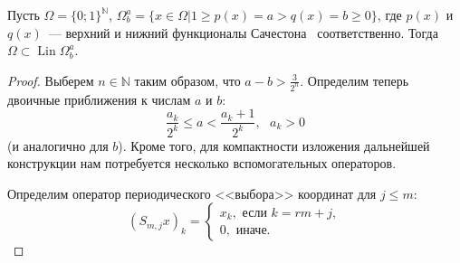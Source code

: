 \begin{theorem}
	Пусть $\Omega = \{0;1\}^\mathbb{N}$,
	$\Omega^a_b = \{x\in\Omega \vert 1 \geq p(x) = a > q(x) = b \geq 0\}$,
	где $p(x)$ и $q(x)$~--- верхний и нижний функционалы Сачестона~\cite{sucheston1967banach} соответственно.
	Тогда $\Omega \subset \operatorname{Lin} \Omega^a_b$.
\end{theorem}

\begin{proof}

	Выберем $n\in\mathbb{N}$ таким образом, что
	$a - b > \frac{3}{2^n}$.
	Определим теперь двоичные приближения к числам $a$ и $b$:
	\begin{equation}
		\label{eq:binary_approximations_for_number}
		\frac{a_k}{2^k} \leq a < \frac{a_k+1}{2^k}
		,
		~~~a_k>0
	\end{equation}
	(и аналогично для $b$).
	Кроме того, для компактности изложения дальнейшей конструкции
	нам потребуется несколько вспомогательных операторов.

	Определим оператор периодического <<выбора>> координат для $j\leq m$:
	\begin{equation}
		(S_{m,j} x)_k = \begin{cases}
			x_{k}, \mbox{~если~}  k = rm + j
			,\\
			0, \mbox{~иначе}
			.
		\end{cases}
	\end{equation}


\end{proof}
